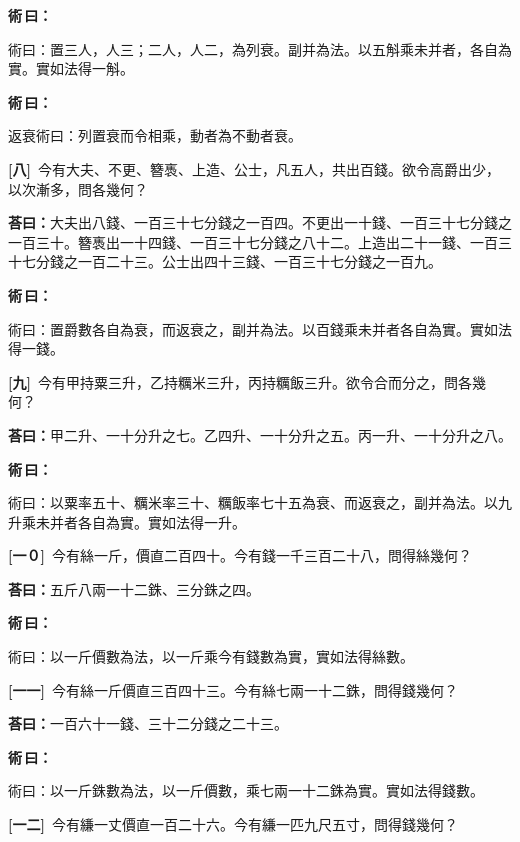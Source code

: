\documentclass[11pt,a4paper]{article}
\newenvironment{method}{%
  \par\noindent\textcolor{methodcolor}{\textbf{術\,曰：}}%
  \ignorespaces
}{\par\vspace{0.5em}}
\newcommand{\problemnum}[1]{\textbf{[\ignorespaces#1\unskip]}}
\begin{document}
\begin{method}
術曰：置三人，人三；二人，人二，為列衰。副并為法。以五斛乘未并者，各自為實。實如法得一斛。
\end{method}

\begin{method}
返衰術曰：列置衰而令相乘，動者為不動者衰。
\end{method}

\noindent\problemnum{八}\,
今有大夫、不更、簪褭、上造、公士，凡五人，共出百錢。欲令高爵出少，以次漸多，問各幾何？

\noindent\textcolor{answercolor}{\textbf{荅曰：}}大夫出八錢、一百三十七分錢之一百四。不更出一十錢、一百三十七分錢之一百三十。簪褭出一十四錢、一百三十七分錢之八十二。上造出二十一錢、一百三十七分錢之一百二十三。公士出四十三錢、一百三十七分錢之一百九。

\begin{method}
術曰：置爵數各自為衰，而返衰之，副并為法。以百錢乘未并者各自為實。實如法得一錢。
\end{method}

\noindent\problemnum{九}\,
今有甲持粟三升，乙持糲米三升，丙持糲飯三升。欲令合而分之，問各幾何？

\noindent\textcolor{answercolor}{\textbf{荅曰：}}甲二升、一十分升之七。乙四升、一十分升之五。丙一升、一十分升之八。

\begin{method}
術曰：以粟率五十、糲米率三十、糲飯率七十五為衰、而返衰之，副并為法。以九升乘未并者各自為實。實如法得一升。
\end{method}

\noindent\problemnum{一０}\,
今有絲一斤，價直二百四十。今有錢一千三百二十八，問得絲幾何？

\noindent\textcolor{answercolor}{\textbf{荅曰：}}五斤八兩一十二銖、三分銖之四。

\begin{method}
術曰：以一斤價數為法，以一斤乘今有錢數為實，實如法得絲數。
\end{method}

\noindent\problemnum{一一}\,
今有絲一斤價直三百四十三。今有絲七兩一十二銖，問得錢幾何？

\noindent\textcolor{answercolor}{\textbf{荅曰：}}一百六十一錢、三十二分錢之二十三。

\begin{method}
術曰：以一斤銖數為法，以一斤價數，乘七兩一十二銖為實。實如法得錢數。
\end{method}

\noindent\problemnum{一二}\,
今有縑一丈價直一百二十六。今有縑一匹九尺五寸，問得錢幾何？
\end{document}
